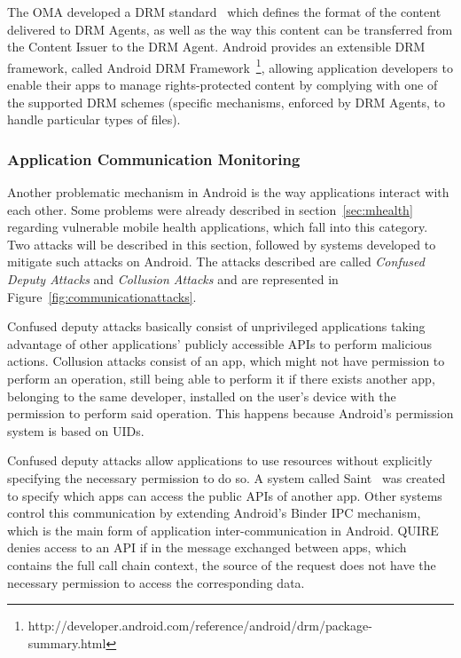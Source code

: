 The \ac{OMA} developed a DRM standard~\cite{drm} which defines the format of the content delivered to DRM Agents, as well as the way this content can be transferred from the Content Issuer to the DRM Agent. Android provides an extensible DRM framework, called Android DRM Framework~\footnote{http://developer.android.com/reference/android/drm/package-summary.html}, allowing application developers to enable their apps to manage rights-protected content by complying with one of the supported DRM schemes (specific mechanisms, enforced by DRM Agents, to handle particular types of files).

\subsubsection{Application Communication Monitoring}

Another problematic mechanism in Android is the way applications interact with each other. Some problems were already described in section~\ref{sec:mhealth} regarding vulnerable mobile health applications, which fall into this category.
Two attacks will be described in this section, followed by systems developed to mitigate such attacks on Android. The attacks described are called \emph{Confused Deputy Attacks} and \emph{Collusion Attacks} and are represented in Figure~\ref{fig:communicationattacks}.

Confused deputy attacks basically consist of unprivileged applications taking advantage of other applications’ publicly accessible APIs to perform malicious actions. Collusion attacks consist of an app, which might not have permission to perform an operation, still being able to perform it if there exists another app, belonging to the same developer, installed on the user’s device with the permission to perform said operation. This happens because Android’s permission system is based on UIDs.

Confused deputy attacks allow applications to use resources without explicitly specifying the necessary permission to do so. %
A system  called Saint~\cite{ongtang2012semantically} was created to specify which apps can access the public APIs of another app. Other systems control this communication by extending Android’s Binder \ac{IPC} mechanism, which is the main form of application inter-communication in Android.
QUIRE~\cite{dietz2011quire} denies access to an API if in the message exchanged between apps, which contains the full call chain context, the source of the request does not have the necessary permission to access the corresponding data.

